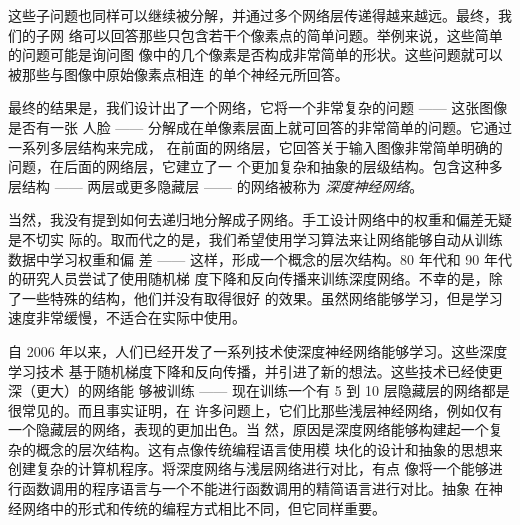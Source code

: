 这些子问题也同样可以继续被分解，并通过多个网络层传递得越来越远。最终，我们的子网
络可以回答那些只包含若干个像素点的简单问题。举例来说，这些简单的问题可能是询问图
像中的几个像素是否构成非常简单的形状。这些问题就可以被那些与图像中原始像素点相连
的单个神经元所回答。

最终的结果是，我们设计出了一个网络，它将一个非常复杂的问题 —— 这张图像是否有一张
人脸 —— 分解成在单像素层面上就可回答的非常简单的问题。它通过一系列多层结构来完成，
在前面的网络层，它回答关于输入图像非常简单明确的问题，在后面的网络层，它建立了一
个更加复杂和抽象的层级结构。包含这种多层结构 —— 两层或更多隐藏层 —— 的网络被称为%
\emph{深度神经网络}。

当然，我没有提到如何去递归地分解成子网络。手工设计网络中的权重和偏差无疑是不切实
际的。取而代之的是，我们希望使用学习算法来让网络能够自动从训练数据中学习权重和偏
差 —— 这样，形成一个概念的层次结构。80 年代和 90 年代的研究人员尝试了使用随机梯
度下降和反向传播来训练深度网络。不幸的是，除了一些特殊的结构，他们并没有取得很好
的效果。虽然网络能够学习，但是学习速度非常缓慢，不适合在实际中使用。

自 2006 年以来，人们已经开发了一系列技术使深度神经网络能够学习。这些深度学习技术
基于随机梯度下降和反向传播，并引进了新的想法。这些技术已经使更深（更大）的网络能
够被训练 —— 现在训练一个有 5 到 10 层隐藏层的网络都是很常见的。而且事实证明，在
许多问题上，它们比那些浅层神经网络，例如仅有一个隐藏层的网络，表现的更加出色。当
然，原因是深度网络能够构建起一个复杂的概念的层次结构。这有点像传统编程语言使用模
块化的设计和抽象的思想来创建复杂的计算机程序。将深度网络与浅层网络进行对比，有点
像将一个能够进行函数调用的程序语言与一个不能进行函数调用的精简语言进行对比。抽象
在神经网络中的形式和传统的编程方式相比不同，但它同样重要。
